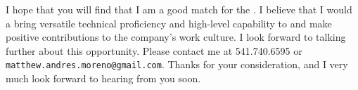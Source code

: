 I hope that you will find that I am a good match for the {\companyposition}.
I believe that I would a bring versatile technical proficiency and high-level capability to {\companyshort} and make positive contributions to the company's work culture.
I look forward to talking further about this opportunity.
Please contact me at 541.740.6595 or \texttt{matthew.andres.moreno@gmail.com}.
Thanks for your consideration, and I very much look forward to hearing from you soon.
